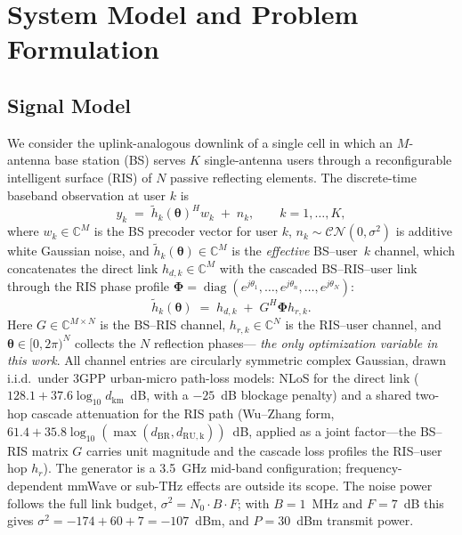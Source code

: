 
\section{System Model and Problem Formulation}
\label{sec:system_model}

\subsection{Signal Model}
We consider the uplink-analogous downlink of a single cell in which an
$M$-antenna base station (BS) serves $K$ single-antenna users through a
reconfigurable intelligent surface (RIS) of $N$ passive reflecting elements.
The discrete-time baseband observation at user $k$ is
\begin{equation}
y_k \;=\; \tilde{h}_k(\boldsymbol{\theta})^{H} w_k \;+\; n_k,
\qquad k = 1,\dots,K,
\label{eq:signal_model}
\end{equation}
where $w_k \in \mathbb{C}^{M}$ is the BS precoder vector for user $k$,
$n_k \sim \mathcal{CN}(0,\sigma^2)$ is additive white Gaussian noise, and
$\tilde{h}_k(\boldsymbol{\theta}) \in \mathbb{C}^{M}$ is the \emph{effective}
BS--user~$k$ channel, which concatenates the direct link $h_{d,k} \in
\mathbb{C}^{M}$ with the cascaded BS--RIS--user link through the RIS phase
profile $\boldsymbol{\Phi} = \operatorname{diag}(e^{j\theta_1}, \dots,
e^{j\theta_n}, \dots, e^{j\theta_N})$:
\begin{equation}
\tilde{h}_k(\boldsymbol{\theta}) \;=\; h_{d,k} \;+\; G^{H} \boldsymbol{\Phi} h_{r,k}.
\label{eq:effective_channel}
\end{equation}
Here $G \in \mathbb{C}^{M \times N}$ is the BS--RIS channel, $h_{r,k} \in
\mathbb{C}^{N}$ is the RIS--user channel, and
$\boldsymbol{\theta} \in [0, 2\pi)^N$ collects the $N$ reflection phases---%
\emph{the only optimization variable in this work}. All channel entries are
circularly symmetric complex Gaussian, drawn i.i.d.\ under 3GPP
urban-micro path-loss models: NLoS for the direct link
($128.1 + 37.6\log_{10} d_{\mathrm{km}}$~dB, with a $-25$~dB blockage
penalty) and a shared two-hop cascade attenuation for the RIS path
(Wu--Zhang form, $61.4 + 35.8\log_{10}(\max(d_{\mathrm{BR}},
d_{\mathrm{RU,k}}))$~dB, applied as a joint factor---the BS--RIS matrix
$G$ carries unit magnitude and the cascade loss profiles the
RIS--user hop $h_{r}$). The generator is a 3.5~GHz mid-band
configuration; frequency-dependent mmWave or sub-THz effects are
outside its scope. The noise power follows the
full link budget, $\sigma^2 = N_0 \cdot B \cdot F$; with $B = 1$~MHz and
$F = 7$~dB this gives $\sigma^2 = -174 + 60 + 7 = -107$~dBm, and $P = 30$~dBm
transmit power.

